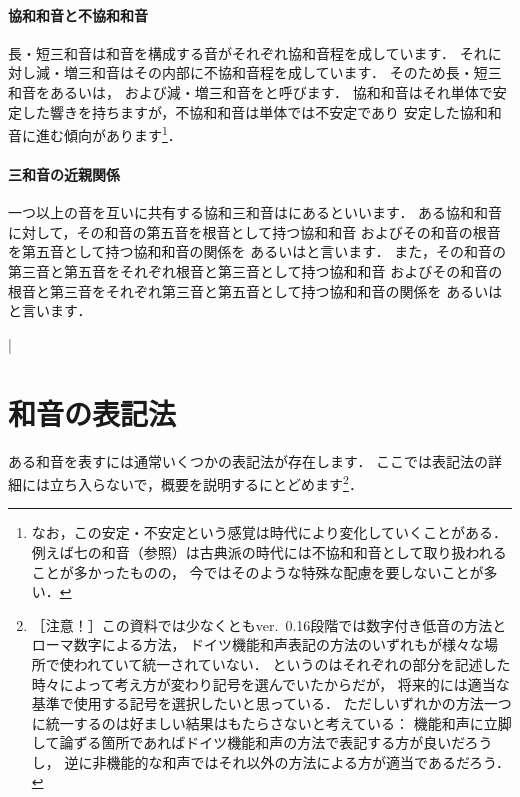 \documentclass[dvipdfmx,uplatex,b5paper,openany,jbase=12Q,nomag*,textwidth-limit=44%
               ]{gachimuchi}[2020/05/05]
\begin{document}
\paragraph{協和和音と不協和和音}
長・短三和音は和音を構成する音がそれぞれ協和音程を成しています．
それに対し減・増三和音はその内部に不協和音程を成しています．
そのため長・短三和音をあるいは，
および減・増三和音をと呼びます．
協和和音はそれ単体で安定した響きを持ちますが，不協和和音は単体では不安定であり
安定した協和和音に進む傾向があります\footnote{%
  なお，この安定・不安定という感覚は時代により変化していくことがある．
  例えば七の和音（参照）は古典派の時代には不協和和音として取り扱われることが多かったものの，
  今ではそのような特殊な配慮を要しないことが多い．
}．
\paragraph{三和音の近親関係}
一つ以上の音を互いに共有する協和三和音はにあるといいます．
ある協和和音に対して，その和音の第五音を根音として持つ協和和音
およびその和音の根音を第五音として持つ協和和音の関係を
あるいはと言います．
また，その和音の第三音と第五音をそれぞれ根音と第三音として持つ協和和音
およびその和音の根音と第三音をそれぞれ第三音と第五音として持つ協和和音の関係を
あるいはと言います．
\begin{Music}[0.6\linewidth]
  \nostartrule%
  \Startpiece%
  \Notes%
  \en\bar%
  \Notes%
  \en%
  \endpiece%
\end{Music}

\section{和音の表記法}
ある和音を表すには通常いくつかの表記法が存在します．
ここでは表記法の詳細には立ち入らないで，概要を説明するにとどめます\footnote{
  ［注意！］この資料では少なくともver.~0.16段階では数字付き低音の方法とローマ数字による方法，
  ドイツ機能和声表記の方法のいずれもが様々な場所で使われていて統一されていない．
  というのはそれぞれの部分を記述した時々によって考え方が変わり記号を選んでいたからだが，
  将来的には適当な基準で使用する記号を選択したいと思っている．
  ただしいずれかの方法一つに統一するのは好ましい結果はもたらさないと考えている：
  機能和声に立脚して論ずる箇所であればドイツ機能和声の方法で表記する方が良いだろうし，
  逆に非機能的な和声ではそれ以外の方法による方が適当であるだろう．
}．
\end{document}
